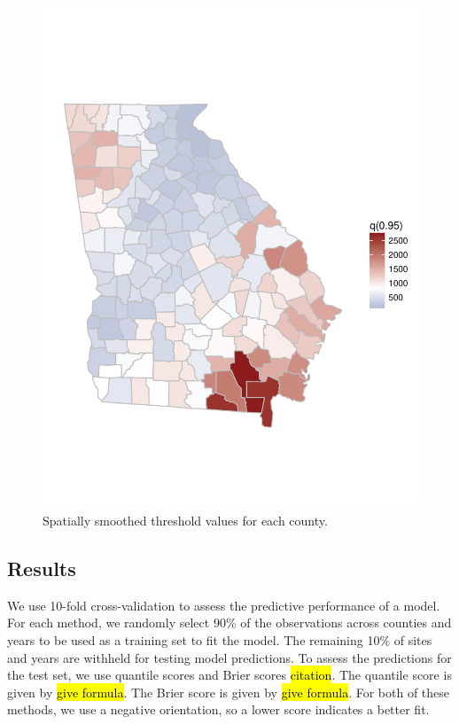 \documentclass[11pt]{article}
\begin{document}
\begin{figure}[htbp]
  \centering
  \includegraphics[width = 0.47\linewidth, trim = 0 10em 0 10em]{plots/fire-spatial-q95.pdf}
  \caption{Spatially smoothed threshold values for each county.}
  \label{fig:mrlthresh}
\end{figure}

\subsection{Results}\label{s:results}
We use 10-fold cross-validation to assess the predictive performance of a model.
For each method, we randomly select 90\% of the observations across counties and years to be used as a training set to fit the model.
The remaining 10\% of sites and years are withheld for testing model predictions.
To assess the predictions for the test set, we use quantile scores and Brier scores \hl{citation}.
The quantile score is given by \hl{give formula}.
The Brier score is given by \hl{give formula}.
For both of these methods, we use a negative orientation, so a lower score indicates a better fit.
\end{document}
